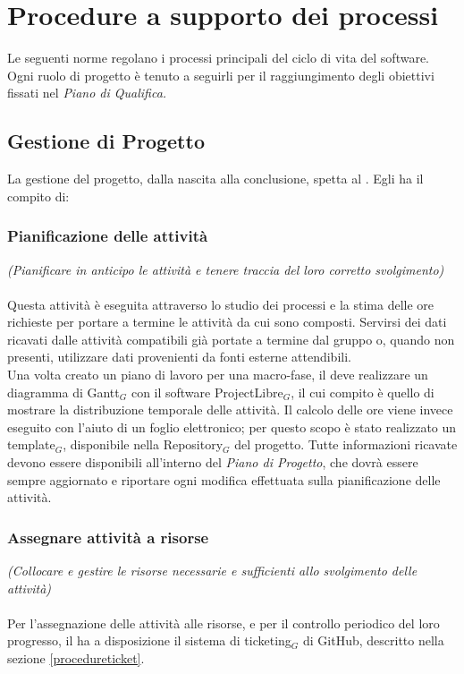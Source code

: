 \section{Procedure a supporto dei processi} \label{procedure}
Le seguenti norme regolano i processi principali del ciclo di vita del software. Ogni ruolo di progetto è tenuto a seguirli per il raggiungimento degli obiettivi fissati nel \textit{Piano di Qualifica.}

\subsection{Gestione di Progetto}
La gestione del progetto, dalla nascita alla conclusione, spetta al \ruoloResponsabile . Egli ha il compito di:
\subsubsection{Pianificazione delle attività}
\textit{(Pianificare in anticipo le attività e tenere traccia del loro corretto svolgimento)} \\ \\
Questa attività è eseguita attraverso lo studio dei processi e la stima delle ore richieste per portare a termine le attività da cui sono composti. Servirsi dei dati ricavati dalle attività compatibili già portate a termine dal gruppo o, quando non presenti, utilizzare dati provenienti da fonti esterne attendibili. \\
Una volta creato un piano di lavoro per una macro-fase, il \ruoloResponsabile{}  deve realizzare un diagramma di Gantt$_G$ con il software ProjectLibre$_G$, il cui compito è quello di mostrare la distribuzione temporale delle attività. Il calcolo delle ore viene invece eseguito con l'aiuto di un foglio elettronico; per questo scopo è stato realizzato un template$_G$, disponibile nella Repository$_G$ del progetto. Tutte informazioni ricavate devono essere disponibili all'interno del \textit{Piano di Progetto}, che dovrà essere sempre aggiornato e riportare ogni modifica effettuata sulla pianificazione delle attività.

\subsubsection{Assegnare attività a risorse}
\textit{(Collocare e gestire le risorse necessarie e sufficienti allo svolgimento delle attività)}\\ \\
Per l'assegnazione delle attività alle risorse, e per il controllo periodico del loro progresso, il \ruoloResponsabile{} ha a disposizione il sistema di ticketing$_G$ di GitHub, descritto nella sezione \ref{procedureticket}.
